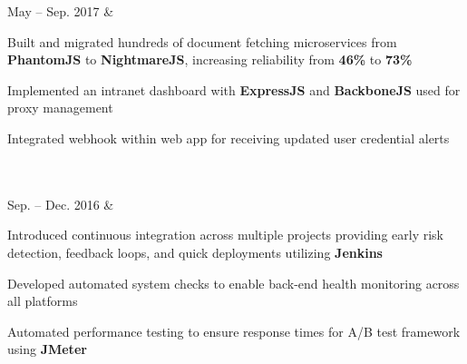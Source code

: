 \documentclass[]{richard-dang}
\begin{document}
\begin{tabularcv}
    May – \newline 
    Sep. 2017   &  
                    \href{http://hubdoc.com}{
                    }
                    \begin{tabitemize}
                        \item Built and migrated hundreds of document fetching microservices from \textbf{PhantomJS} to \textbf{NightmareJS}, increasing reliability from \textbf{46\%} to \textbf{73\%}
                        \item Implemented an intranet dashboard with \textbf{ExpressJS} and \textbf{BackboneJS} used for proxy management
                        \item Integrated webhook within web app for receiving updated user credential alerts 
                    \end{tabitemize} 
                    \\[\vspacepar]\\[\vspacepar]
    Sep. – \newline 
    Dec. 2016   &   
                    \href{http://flipp.com}{
                    }
                    \begin{tabitemize}
                        \item Introduced continuous integration across multiple projects providing early risk detection, feedback loops, and quick deployments utilizing \textbf{Jenkins}
                        \item Developed automated system checks to enable back-end health monitoring across all platforms
                        \item Automated performance testing to ensure response times for A/B test framework using \textbf{JMeter}
                    \end{tabitemize} 
\end{tabularcv}   
\end{document}
